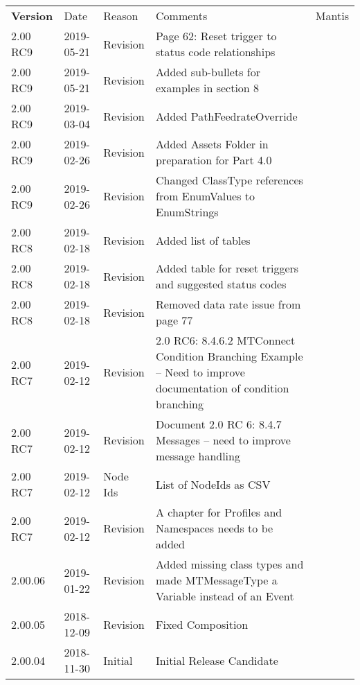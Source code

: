 \documentclass{mtc-opc}	%
\begin{document}
\begin{nolinenumbers}
\begin{table}[ht]
    \centering
    \fontsize{9pt}{11pt}\selectfont
    \tabulinesep=3pt
    \begin{tabu} to 6in {|X[-1]|X[-1.25]|X[-0.75]|X[5.25]|X[-0.75]|} \everyrow{\hline}
        \hline
        \rowfont \bfseries Version & Date & Reason & Comments & Mantis \\
        2.00 RC9 & 2019-05-21 & Revision & Page 62: Reset trigger to status code relationships &  \\
        2.00 RC9 & 2019-05-21 & Revision & Added sub-bullets for examples in section 8 &  \\
        2.00 RC9 & 2019-03-04 & Revision & Added PathFeedrateOverride &  \\
        2.00 RC9 & 2019-02-26 & Revision & Added Assets Folder in preparation for Part 4.0 &  \\
        2.00 RC9 & 2019-02-26 & Revision & Changed ClassType references from EnumValues to EnumStrings &  \\
        2.00 RC8 & 2019-02-18 & Revision & Added list of tables &  \\
        2.00 RC8 & 2019-02-18 & Revision & Added table for reset triggers and suggested status codes &  \\
        2.00 RC8 & 2019-02-18 & Revision & Removed data rate issue from page 77 &  \\
        2.00 RC7 & 2019-02-12 & Revision & 2.0 RC6: 8.4.6.2 MTConnect Condition Branching Example -- Need to improve documentation of condition branching &  \\        
        2.00 RC7 & 2019-02-12 & Revision & Document 2.0 RC 6: 8.4.7 Messages -- need to improve message handling &  \\
        2.00 RC7 & 2019-02-12 & Node Ids & List of NodeIds as CSV &  \\
        2.00 RC7 & 2019-02-12 & Revision & A chapter for Profiles and Namespaces needs to be added &   \\
        2.00.06 & 2019-01-22 & Revision & Added missing class types and made MTMessageType a Variable instead of an Event &\\
        2.00.05 & 2018-12-09 & Revision & Fixed Composition & \\
        2.00.04 & 2018-11-30 & Initial & Initial Release Candidate & \\ 
    \end{tabu}
\end{table}

\clearpage
\tableofcontents
\thispagestyle{fancy}

\clearpage
\listoffigures

\clearpage
\listoftables

\clearpage

\end{nolinenumbers}
\end{document}
